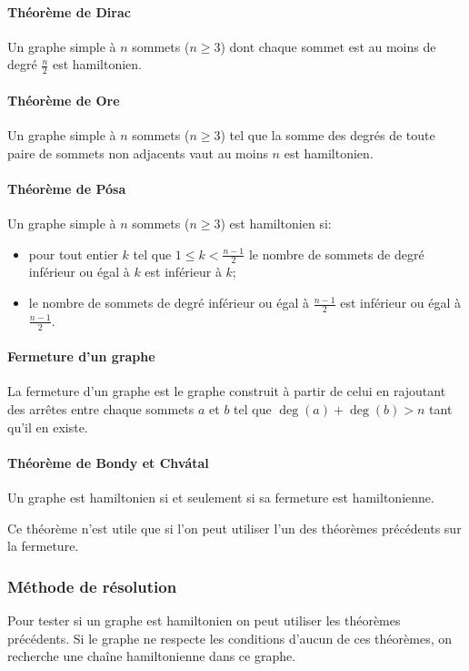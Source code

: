     \paragraph{Théorème de Dirac} Un graphe simple à $n$ sommets ($n \ge 3$)
    dont chaque sommet est au moins de degré $\frac{n}{2}$ est hamiltonien.

    \paragraph{Théorème de Ore} Un graphe simple à $n$ sommets ($n \ge 3$) tel
    que la somme des degrés de toute paire de sommets non adjacents vaut au
    moins $n$ est hamiltonien.

    \paragraph{Théorème de Pósa} Un graphe simple à $n$ sommets ($n \ge 3$) est
    hamiltonien si:
    \begin{itemize}
      \item pour tout entier $k$ tel que $1 \le k < \frac{n-1}{2}$ le nombre de
        sommets de degré inférieur ou égal à $k$ est inférieur à $k$;
      \item le nombre de sommets de degré inférieur ou égal à $\frac{n-1}{2}$
        est inférieur ou égal à $\frac{n-1}{2}$.
    \end{itemize}

    \paragraph{Fermeture d'un graphe} La fermeture d'un graphe est
    le graphe construit à partir de celui en rajoutant des arrêtes entre chaque
    sommets $a$ et $b$ tel que $\deg(a)+\deg(b) > n$ tant qu'il en existe.

    \paragraph{Théorème de Bondy et Chvátal} Un graphe est hamiltonien si et
    seulement si sa fermeture est hamiltonienne.

    Ce théorème n'est utile que si l'on peut utiliser l'un des théorèmes
    précédents sur la fermeture.

  \subsubsection{Méthode de résolution}
    Pour tester si un graphe est hamiltonien on peut utiliser les théorèmes
    précédents. Si le graphe ne respecte les conditions d'aucun de ces
    théorèmes, on recherche une chaîne hamiltonienne dans ce graphe.

